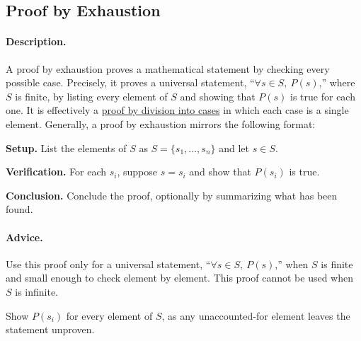 \subsection{Proof by Exhaustion}
\label{subsections:techniques:universal:exhaustion}



\paragraph{Description.}
A proof by exhaustion proves a mathematical statement by checking every %
possible case. %
Precisely, it proves a universal statement, %
``$\forall s \in S,\ P(s)$,'' where $S$ is finite, by listing every element %
of $S$ and showing that $P(s)$ is true for each one. %
It is effectively a %
\hyperref[subsections:techniques:universal:cases]{%
    proof by division into cases} %
in which each case is a single element. %
Generally, a proof by exhaustion mirrors the following format:
\begin{enumerate}{
    \item \textbf{Setup.} %
        List the elements of $S$ as $S = \{s_1, \dots, s_n\}$ %
        and let $s \in S$.
    \item \textbf{Verification.} %
        For each $s_i$, suppose $s = s_i$ and show that $P(s_i)$ is true.
    \item \textbf{Conclusion.} %
        Conclude the proof, optionally by summarizing what has been found.
}
\end{enumerate}



\paragraph{Advice.}
\begin{itemize}{
    \item Use this proof only for a universal statement, %
        ``$\forall s \in S,\ P(s)$,'' when $S$ is finite and small enough to %
        check element by element. %
        This proof cannot be used when $S$ is infinite.
    \item Show $P(s_i)$ for every element of $S$, as any unaccounted-for %
        element leaves the statement unproven.
}
\end{itemize}



